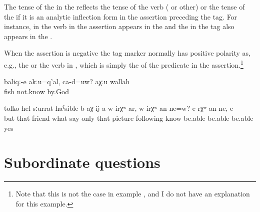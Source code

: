 The tense of the  in the  reflects the tense of the verb ( or other) or the tense of the  if it is an analytic inflection form in the assertion preceding the tag. For instance, in  the verb in the assertion appears in the  and the  in the tag also appears in the .

When the assertion is negative the tag marker normally has positive polarity as, e.g., the    or the verb in , which is simply the  of the predicate in the assertion.\footnote{Note that this is not the case in example , and I do not have an explanation for this example.}

\begin{exe}
	\ex	\label{ex:(These) are not fish, are they? By God, I don't know}
	\gll	baliqː-e	akːu=q'al,	ca-d=uw? 	aχːu	wallah\\
		fish		 	not.know	by.God\\
	\glt	{}

	\ex	\label{ex:And these friends, what they are saying, only by means of the picture, (one) cannot know, can one? One cannot know, yes}
	\gll	[a	iš-tːi	juldašː-e	ce	b-ik'-ul=el]	tolko	hel sːurrat	ħaˁsible	b-aχ-ij	a-w-irχʷ-ar,	w-irχʷ-an-ne=w? 		e-rχʷ-an-ne,	e\\
		but	that	friend	what	say	only	that picture	following	know	be.able be.able	be.able	yes\\
	\glt	{}
\end{exe}



\section{Subordinate questions}
\label{sec:Subordinate questions}

